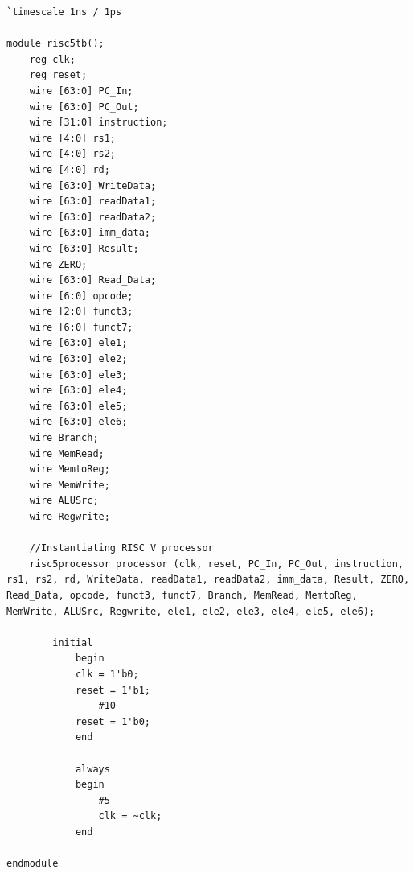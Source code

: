 \documentclass{article}
\begin{document}
\begin{lstlisting}[caption={RISC-V Simulation Source Code}, captionpos=b, language=RISC-V]
`timescale 1ns / 1ps

module risc5tb();
    reg clk;
    reg reset;
    wire [63:0] PC_In;
    wire [63:0] PC_Out;
    wire [31:0] instruction;
    wire [4:0] rs1; 
    wire [4:0] rs2; 
    wire [4:0] rd;
    wire [63:0] WriteData;
    wire [63:0] readData1;
    wire [63:0] readData2;
    wire [63:0] imm_data;
    wire [63:0] Result;
    wire ZERO;
    wire [63:0] Read_Data;
    wire [6:0] opcode;
    wire [2:0] funct3;
    wire [6:0] funct7;
    wire [63:0] ele1;
    wire [63:0] ele2;
    wire [63:0] ele3;
    wire [63:0] ele4;
    wire [63:0] ele5;
    wire [63:0] ele6;
    wire Branch;
    wire MemRead;
    wire MemtoReg;
    wire MemWrite;
    wire ALUSrc;
    wire Regwrite;
    
    //Instantiating RISC V processor 
    risc5processor processor (clk, reset, PC_In, PC_Out, instruction, rs1, rs2, rd, WriteData, readData1, readData2, imm_data, Result, ZERO, Read_Data, opcode, funct3, funct7, Branch, MemRead, MemtoReg, MemWrite, ALUSrc, Regwrite, ele1, ele2, ele3, ele4, ele5, ele6);

        initial
            begin
            clk = 1'b0;
            reset = 1'b1;
                #10
            reset = 1'b0;
            end
            
            always
            begin
                #5
                clk = ~clk;
            end 
        
endmodule

\end{lstlisting}
\end{document}
